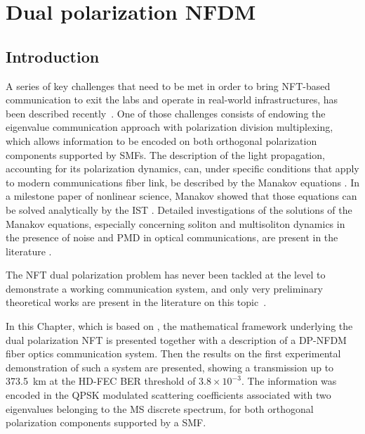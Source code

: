 \chapter{Dual polarization \acl{NFDM}}\label{ch:dual_pol_nfdm}

\section{Introduction}

A series of key challenges that need to be met in order to bring \ac{NFT}-based communication to exit the labs and operate in real-world infrastructures, has been described recently~\cite{Turitsyn2017}. One of those challenges consists  of endowing the eigenvalue communication approach with polarization division multiplexing, which allows information to be encoded on both orthogonal polarization components supported by \acp{SMF}.
The description of the light propagation, accounting for its polarization dynamics, can, under specific conditions that apply to modern communications fiber link, be described by the Manakov equations \cite{Wai1991a}.
In a milestone paper of nonlinear science, Manakov showed that those equations can be solved analytically by the \ac{IST} \cite{Manakov1974a}. Detailed investigations of the solutions of the Manakov equations, especially concerning soliton and multisoliton dynamics in the presence of noise and \ac{PMD} in optical communications, are present in the literature \cite{yang1999multisoliton,lakoba1997perturbation,xie2002influences,chen2000manakov,horikis2004nonlinear,derevyanko2006statistics}.

The \ac{NFT} dual polarization problem has never been tackled at the level to demonstrate a working communication system,
and only very preliminary theoretical works are present in the literature on this topic~\cite{Maruta,Goossens:17}.

In this Chapter, which is based on \cite{gaiarin2016high,Gaiarin2018}, the mathematical framework underlying the dual polarization \ac{NFT} is presented together with a description of a \ac{DP-NFDM} fiber optics communication system. Then the results on the first experimental demonstration of such a system are presented, showing a transmission up to \SI{373.5}{\km} at the \ac{HD-FEC} \ac{BER} threshold of $3.8\times10^{-3}$. The information was encoded in the \ac{QPSK} modulated scattering coefficients associated with two eigenvalues belonging to the \ac{MS} discrete spectrum, for both orthogonal polarization components supported by a \ac{SMF}.

